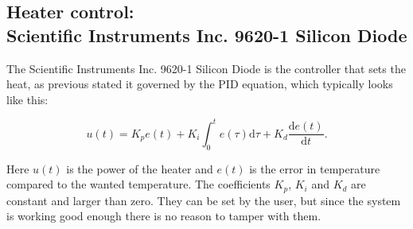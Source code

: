 \documentclass[a4paper,12pt]{article}
\begin{document}
\subsection{Heater control: \\ Scientific Instruments Inc. 9620-1 Silicon Diode}
The Scientific Instruments Inc. 9620-1 Silicon Diode is the controller that sets the heat, as previous stated it governed by the PID equation, which typically looks like this:

\begin{equation}
u(t)= K_pe(t) + K_i\int_0^t \! e(\tau)\mathrm{d}\tau + K_d\frac{\mathrm{d}e(t)}{\mathrm{d}t}.
\label{eq:PID}
\end{equation}

\noindent Here $u(t)$ is the power of the heater and $e(t)$ is the error in temperature compared to the wanted temperature. The coefficients $K_p$, $K_i$ and $K_d$ are constant and larger than zero. They can be set by the user, but since the system is working good enough there is no reason to tamper with them. 


%
%


\end{document}
